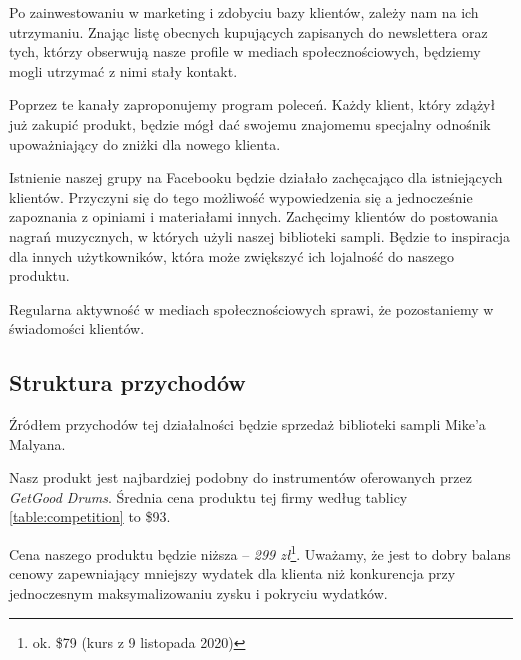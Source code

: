 \documentclass[12pt]{article}
\newcommand{\productpricezl}{299 zł\xspace}
\begin{document}

Po zainwestowaniu w marketing i zdobyciu bazy klientów, zależy nam na ich utrzymaniu.
Znając listę obecnych kupujących zapisanych do newslettera oraz tych, którzy obserwują nasze profile w mediach społecznościowych, będziemy mogli utrzymać z nimi stały kontakt.

Poprzez te kanały zaproponujemy program poleceń.
Każdy klient, który zdążył już zakupić produkt, będzie mógł dać swojemu znajomemu specjalny odnośnik upoważniający do zniżki dla nowego klienta.

Istnienie naszej grupy na Facebooku będzie działało zachęcająco dla istniejących klientów.
Przyczyni się do tego możliwość wypowiedzenia się a jednocześnie zapoznania z opiniami i materiałami innych.
Zachęcimy klientów do postowania nagrań muzycznych, w których użyli naszej biblioteki sampli.
Będzie to inspiracja dla innych użytkowników, która może zwiększyć ich lojalność do naszego produktu.

Regularna aktywność w mediach społecznościowych sprawi, że pozostaniemy w świadomości klientów.

\subsection{Struktura przychodów}


Źródłem przychodów tej działalności będzie sprzedaż biblioteki sampli Mike'a Malyana.

Nasz produkt jest najbardziej podobny do instrumentów oferowanych przez \textit{GetGood Drums}.
Średnia cena produktu tej firmy według tablicy \ref{table:competition} to \$93.

Cena naszego produktu będzie niższa -- \emph{\productpricezl}\footnote{ok. \$79 (kurs z 9 listopada 2020)}.
Uważamy, że jest to dobry balans cenowy zapewniający mniejszy wydatek dla klienta niż konkurencja przy jednoczesnym maksymalizowaniu zysku i pokryciu wydatków.
\end{document}
